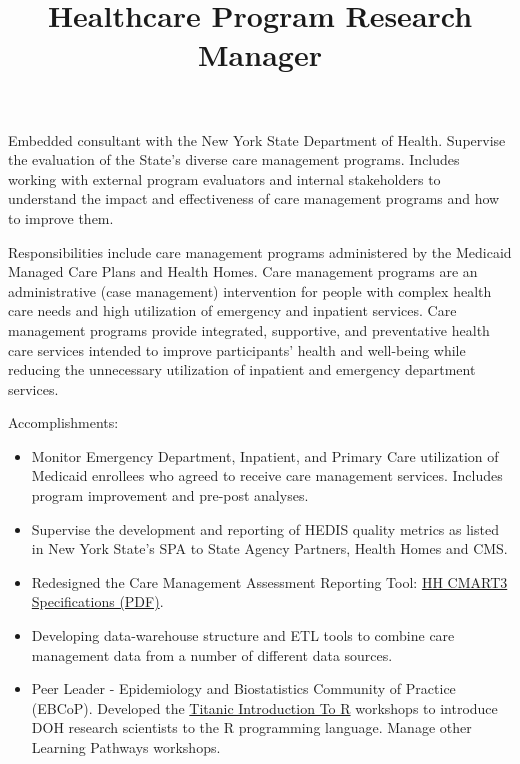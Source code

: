\documentclass[line, mm, 10pt]{res}
\begin{document}
\begin{resume}
  \title{Healthcare Program Research Manager}
  \begin{position}
    Embedded consultant with the New York State Department of
    Health. Supervise the evaluation of the State's diverse care
    management programs. Includes working with external program
    evaluators and internal stakeholders to understand the impact and
    effectiveness of care management programs and how to improve them.

    Responsibilities include care management programs administered by
    the Medicaid Managed Care Plans and Health Homes. Care management
    programs are an administrative (case management) intervention for
    people with complex health care needs and high utilization of
    emergency and inpatient services. Care management programs provide
    integrated, supportive, and preventative health care services
    intended to improve participants' health and well-being while
    reducing the unnecessary utilization of inpatient and emergency
    department services.

    Accomplishments:
    \begin{itemize}
    \item Monitor Emergency Department, Inpatient, and Primary Care
      utilization of Medicaid enrollees who agreed to receive care
      management services. Includes program improvement and pre-post
      analyses.
    \item Supervise the development and reporting of HEDIS quality
      metrics as listed in New York State's SPA to State Agency
      Partners, Health Homes and CMS.
    \item Redesigned the Care Management Assessment Reporting Tool:
      \href{https://www.health.ny.gov/health_care/medicaid/program/medicaid_health_homes/assessment_quality_measures/docs/hh_cmart_specs_v3.pdf}{HH
        CMART3 Specifications (PDF)}.
    \item Developing data-warehouse structure and ETL tools to combine
      care management data from a number of different data sources.
    \item Peer Leader - Epidemiology and Biostatistics Community of
      Practice (EBCoP). Developed the
      \href{http://choens.github.io/titanic/}{Titanic Introduction To
        R} workshops to introduce DOH research scientists to the R
      programming language. Manage other Learning Pathways workshops.
    \end{itemize}
  \end{position}


\end{resume}
\end{document}
